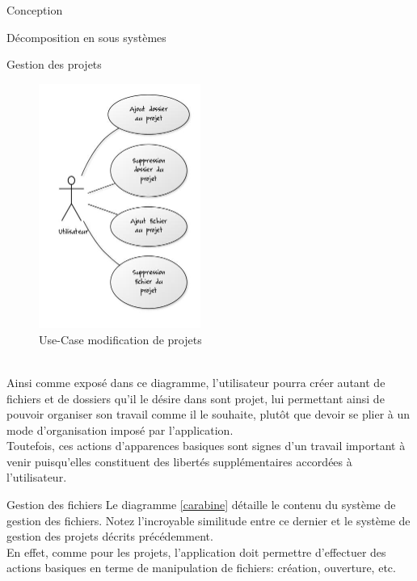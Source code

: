 \documentclass[a4paper, 12pt]{report}
\begin{document}
\begin{part}{Conception}
\begin{chapter}{Décomposition en sous systèmes}
\begin{section}{Gestion des projets}
				\begin{figure}[h]
					\begin{center}
						\includegraphics[height=8cm]{images/modificationProjet.jpg}
						\caption{Use-Case modification de projets}
						\label{ucgp}
					\end{center}
				\end{figure}~\\

				Ainsi comme exposé dans ce diagramme, l'utilisateur pourra créer autant de fichiers et de dossiers qu'il le désire dans 
				sont projet, lui permettant ainsi de pouvoir organiser son travail comme il le souhaite, plutôt que devoir se plier à un 
				mode d'organisation imposé par l'application.\\
				Toutefois, ces actions d'apparences basiques sont signes d'un travail important à venir puisqu'elles constituent des libertés
				supplémentaires	accordées à l'utilisateur.\\
			\end{section}
			\begin{section}{Gestion des fichiers}
				Le diagramme \ref{carabine} détaille le contenu du système de gestion des fichiers. Notez l'incroyable similitude entre ce
				dernier et le système de gestion des projets décrits précédemment.\\
				En effet, comme pour les projets, l'application doit permettre d'effectuer des actions basiques en terme de manipulation de fichiers:
				création, ouverture, etc.\\



\end{section}
\end{chapter}
\end{part}
\end{document}
